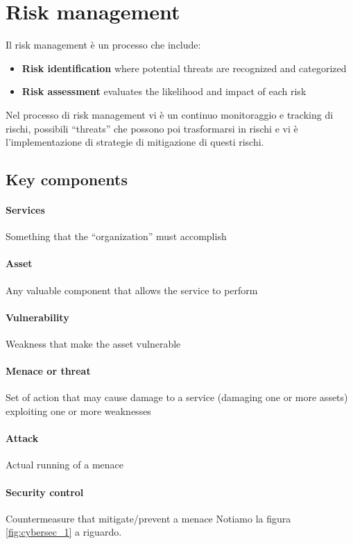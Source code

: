 %
\section{Risk management}
Il risk management è un processo che include:
\begin{itemize}
    \item \textbf{Risk identification} where potential threats are recognized and categorized
    \item \textbf{Risk assessment} evaluates the likelihood and impact of each risk
\end{itemize}
Nel processo di risk management vi è un continuo monitoraggio e tracking di rischi, possibili ``threats'' che possono poi trasformarsi in rischi e vi è l'implementazione di strategie di mitigazione di questi rischi.

%
\subsection{Key components}
%
\paragraph{Services} Something that the ``organization'' must accomplish
%
\paragraph{Asset} Any valuable component that allows the service to perform
%
\paragraph{Vulnerability} Weakness that make the asset vulnerable
%
\paragraph{Menace or threat} Set of action that may cause damage to a service (damaging one or
more assets) exploiting one or more weaknesses
%
\paragraph{Attack} Actual running of a menace
%
\paragraph{Security control} Countermeasure that mitigate/prevent a menace
Notiamo la figura \ref{fig:cybersec_1} a riguardo.

